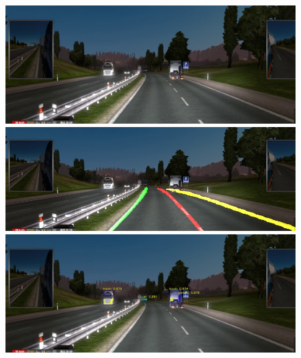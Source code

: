 \documentclass[runningheads]{llncs}
\begin{document}
\begin{figure}[!htb]
	\includegraphics[width=\linewidth]{result/w000131.jpg}
	\endminipage\hfill
	\includegraphics[width=\linewidth]{result/w000131-lane.jpg}
	\endminipage\hfill
	\includegraphics[width=\linewidth]{result/w000131-obj.jpg}
	\endminipage


\end{figure}
\end{document}
